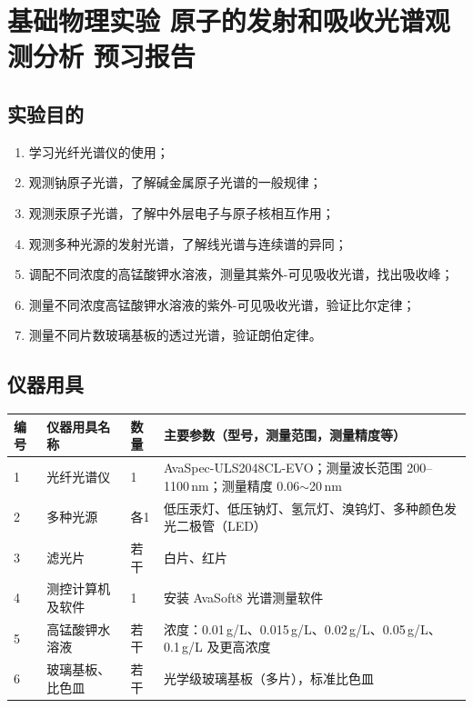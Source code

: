\documentclass[dvipsnames, svgnames,a4paper,11pt]{article}
\begin{document}
\clearpage

\setcounter{section}{0}
\section{基础物理实验  \quad 原子的发射和吸收光谱观测分析 \heiti 预习报告}

	
\subsection{实验目的}
\begin{enumerate}
	\item 学习光纤光谱仪的使用；
	\item 观测钠原子光谱，了解碱金属原子光谱的一般规律；
	\item 观测汞原子光谱，了解中外层电子与原子核相互作用；
	\item 观测多种光源的发射光谱，了解线光谱与连续谱的异同；
	\item 调配不同浓度的高锰酸钾水溶液，测量其紫外-可见吸收光谱，找出吸收峰；
	\item 测量不同浓度高锰酸钾水溶液的紫外-可见吸收光谱，验证比尔定律；
	\item 测量不同片数玻璃基板的透过光谱，验证朗伯定律。
\end{enumerate}

\subsection{仪器用具}
\begin{table}[htbp]
	\centering
	\renewcommand\arraystretch{1.6}
	\begin{tabular}{p{}|p{}|p{}|p{}}
	\hline
	编号& 仪器用具名称 & 数量 &  主要参数（型号，测量范围，测量精度等） \\
	\hline
	1& 光纤光谱仪 &1 & AvaSpec-ULS2048CL-EVO；测量波长范围 200--1100\,nm；测量精度 0.06$\sim$20\,nm \\

	2& 多种光源 &各1 & 低压汞灯、低压钠灯、氢氘灯、溴钨灯、多种颜色发光二极管（LED） \\
	
	3& 滤光片 & 若干 & 白片、红片 \\
	
	4& 测控计算机及软件 &1 & 安装 AvaSoft8 光谱测量软件 \\

	5& 高锰酸钾水溶液 & 若干 & 浓度：0.01\,g/L、0.015\,g/L、0.02\,g/L、0.05\,g/L、0.1\,g/L 及更高浓度 \\

	6& 玻璃基板、比色皿 & 若干 & 光学级玻璃基板（多片），标准比色皿 \\
	\hline
\end{tabular}
\end{table}
\end{document}
